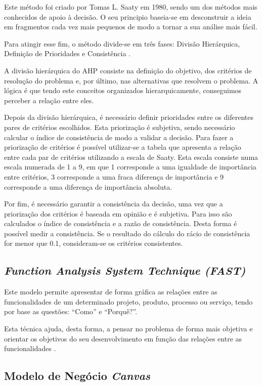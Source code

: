 Este método foi criado por Tomas L. Saaty em 1980, sendo um dos métodos mais conhecidos de apoio à decisão. O seu principio baseia-se em desconstruir a ideia em fragmentos cada vez mais pequenos de modo a tornar a sua análise mais fácil.

Para atingir esse fim, o método divide-se em três fases: Divisão Hierárquica, Definição de Prioridades e Consistência \cite{ahp}.

A divisão hierárquica do AHP consiste na definição do objetivo, dos critérios de resolução do problema e, por último, nas alternativas que resolvem o problema. A lógica é que tendo este conceitos organizados hierarquicamente, conseguimos perceber a relação entre eles.

Depois da divisão hierárquica, é necessário definir prioridades entre os diferentes pares de critérios escolhidos. Esta priorização é subjetiva, sendo necessário calcular o índice de consistência de modo a validar a decisão. Para fazer a priorização de critérios é possível utilizar-se a tabela que apresenta a relação entre cada par de critérios utilizando a escala de Saaty. Esta escala consiste numa escala numerada de 1 a 9, em que 1 corresponde a uma igualdade de importância entre critérios, 3 corresponde a uma fraca diferença de importância e 9 corresponde a uma diferença de importância absoluta.

Por fim, é necessário garantir a consistência da decisão, uma vez que a priorização dos critérios é baseada em opinião e é subjetiva. Para isso são calculados o índice de consistência e a razão de consistência. Desta forma é possível medir a consistência. Se o resultado do cálculo do rácio de consistência for menor que 0.1, consideram-se os critérios consistentes.

\subsection{\emph{Function Analysis System Technique (FAST) \label{sym:FAST}}}

Este modelo permite apresentar de forma gráfica as relações entre as funcionalidades de um determinado projeto, produto, processo ou serviço, tendo por base as questões: “Como” e “Porquê?”\cite{fast}.

Esta técnica ajuda, desta forma, a pensar no problema de forma mais objetiva e orientar os objetivos do seu desenvolvimento em função das relações entre as funcionalidades \cite{fast}.


\subsection{Modelo de Negócio \emph{Canvas}}

